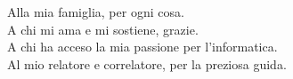 
\vspace*{\fill}

\begin{flushright}
Alla mia famiglia, per ogni cosa. \\
A chi mi ama e mi sostiene, grazie. \\
A chi ha acceso la mia passione per l'informatica. \\
Al mio relatore e correlatore, per la preziosa guida. \\

\end{flushright}

\vspace*{\fill}
\clearpage